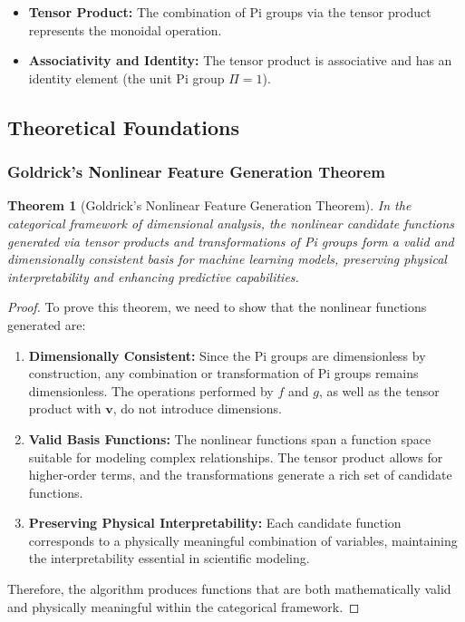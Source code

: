 \documentclass{article}
\newtheorem{theorem}{Theorem}[section]
\theoremstyle{definition}
\theoremstyle{remark}
\begin{document}
\begin{itemize}
	\item \textbf{Tensor Product:} The combination of Pi groups via the tensor product represents the monoidal operation.
	\item \textbf{Associativity and Identity:} The tensor product is associative and has an identity element (the unit Pi group $\Pi = 1$).
\end{itemize}

\subsection{Theoretical Foundations}

\subsubsection{Goldrick's Nonlinear Feature Generation Theorem}

\begin{theorem}[Goldrick's Nonlinear Feature Generation Theorem]
	In the categorical framework of dimensional analysis, the nonlinear candidate functions generated via tensor products and transformations of Pi groups form a valid and dimensionally consistent basis for machine learning models, preserving physical interpretability and enhancing predictive capabilities.
\end{theorem}

\begin{proof}
	To prove this theorem, we need to show that the nonlinear functions generated are:
	
	\begin{enumerate}
		\item \textbf{Dimensionally Consistent:} Since the Pi groups are dimensionless by construction, any combination or transformation of Pi groups remains dimensionless. The operations performed by $f$ and $g$, as well as the tensor product with $\mathbf{v}$, do not introduce dimensions.
		\item \textbf{Valid Basis Functions:} The nonlinear functions span a function space suitable for modeling complex relationships. The tensor product allows for higher-order terms, and the transformations generate a rich set of candidate functions.
		\item \textbf{Preserving Physical Interpretability:} Each candidate function corresponds to a physically meaningful combination of variables, maintaining the interpretability essential in scientific modeling.
	\end{enumerate}
	
	Therefore, the algorithm produces functions that are both mathematically valid and physically meaningful within the categorical framework.
\end{proof}
\end{document}
